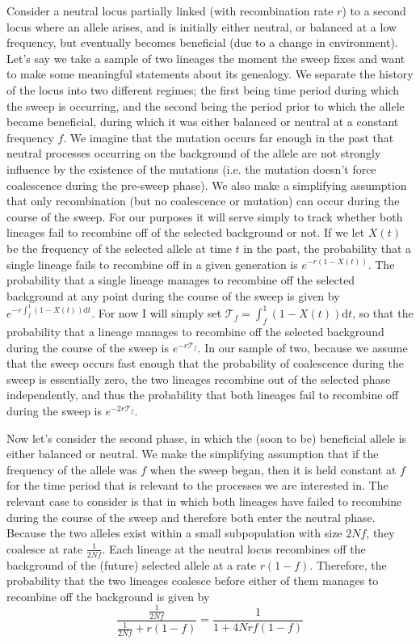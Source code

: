 \documentclass[a4paper,10pt]{article}
\begin{document}
Consider a neutral locus partially linked (with recombination rate $r$) to a second locus where an allele arises, and is initially either neutral, or balanced at a low frequency, but eventually becomes beneficial (due to a change in environment). Let's say we take a sample of two lineages the moment the sweep fixes and want to make some meaningful statements about its genealogy. We separate the history of the locus into two different regimes; the first being time period during which the sweep is occurring, and the second being the period prior to which the allele became beneficial, during which it was either balanced or neutral at a constant frequency $f$. We imagine that the mutation occurs far enough in the past that neutral processes occurring on the background of the allele are not strongly influence by the existence of the mutations (i.e. the mutation doesn't force coalescence during the pre-sweep phase). We also make a simplifying assumption that only recombination (but no coalescence or mutation) can occur during the course of the sweep. For our purposes it will serve simply to track whether both lineages fail to recombine off of the selected background or not. If we let $X\left(t\right)$ be the frequency of the selected allele at time $t$ in the past, the probability that a single lineage fails to recombine off in a given generation is $e^{-r\left(1-X(t)\right)}$. The probability that a single lineage manages to recombine off the selected background at any point during the course of the sweep is given by $e^{-r \int_f^{1}(1-X\left(t\right))\mathrm{d}t}$. For now I will simply set $\mathcal{T}_f = \int_f^{1}(1-X\left(t\right))\mathrm{d}t$, so that the probability that a lineage manages to recombine off the selected background during the course of the sweep is $e^{-r\mathcal{T}_f}$. In our sample of two, because we assume that the sweep occurs fast enough that the probability of coalescence during the sweep is essentially zero, the two lineages recombine out of the selected phase independently, and thus the probability that both lineages fail to recombine off during the sweep is $e^{-2r\mathcal{T}_f}$.

Now let's consider the second phase, in which the (soon to be) beneficial allele is either balanced or neutral. We make the simplifying assumption that if the frequency of the allele was $f$ when the sweep began, then it is held constant at $f$ for the time period that is relevant to the processes we are interested in. The relevant case to consider is that in which both lineages have failed to recombine during the course of the sweep and therefore both enter the neutral phase. Because the two alleles exist within a small subpopulation with size $2Nf$, they coalesce at rate $\frac{1}{2Nf}$. Each lineage at the neutral locus recombines off the background of the (future) selected allele at a rate $r(1-f)$. Therefore, the probability that the two lineages coalesce before either of them manages to recombine off the background is given by
$$\frac{\frac{1}{2Nf}}{\frac{1}{2Nf} + r(1-f)} = \frac{1}{1 + 4Nrf(1-f)}$$
\end{document}
